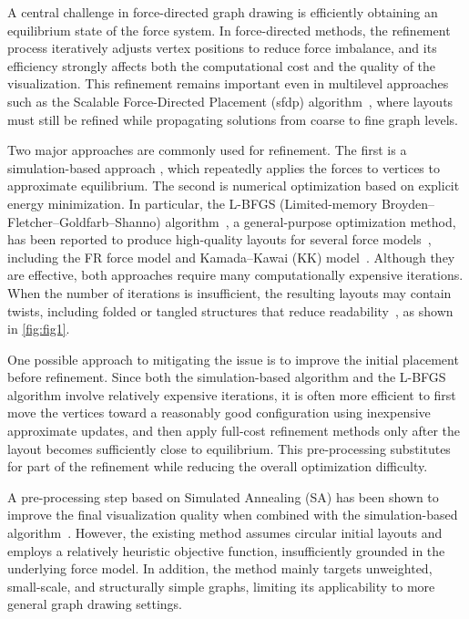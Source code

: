 \documentclass{jgaa-art}
\begin{document}
A central challenge in force-directed graph drawing is efficiently obtaining an equilibrium state of the force system.
In force-directed methods, the refinement process iteratively adjusts vertex positions to reduce force imbalance, and its efficiency strongly affects both the computational cost and the quality of the visualization.
This refinement remains important even in multilevel approaches such as the Scalable Force-Directed Placement (\textsf{sfdp}) algorithm~\citep{Hu2006EfficientHF,ellsonGraphvizOpenSource2002}, where layouts must still be refined while propagating solutions from coarse to fine graph levels.

Two major approaches are commonly used for refinement.
The first is a simulation-based approach \citep{fruchtermanGraphDrawingForcedirected1991}, which repeatedly applies the forces to vertices to approximate equilibrium.
The second is numerical optimization based on explicit energy minimization.
In particular, the L-BFGS (Limited-memory Broyden--Fletcher--Goldfarb--Shanno) algorithm~\citep{liuLimitedMemoryBFGS1989a}, a general-purpose optimization method, has been reported to produce high-quality layouts for several force models~\citep{6183577}, including the FR force model and Kamada--Kawai (KK) model~\citep{kamadaAlgorithmDrawingGeneral1989}.
Although they are effective, both approaches require many computationally expensive iterations.
When the number of iterations is insufficient, the resulting layouts may contain twists, including folded or tangled structures that reduce readability~\cite{veldhuizenDynamicMultilevelGraph2007,cheongSnapshotVisualizationComplex2018}, as shown in \cref{fig:fig1}.

One possible approach to mitigating the issue is to improve the initial placement before refinement.
Since both the simulation-based algorithm and the L-BFGS algorithm involve relatively expensive iterations, it is often more efficient to first move the vertices toward a reasonably good configuration using inexpensive approximate updates, and then apply full-cost refinement methods only after the layout becomes sufficiently close to equilibrium.
This pre-processing substitutes for part of the refinement while reducing the overall optimization difficulty.

A pre-processing step based on Simulated Annealing (SA) has been shown to improve the final visualization quality when combined with the simulation-based algorithm~\cite{ghassemitoosiSimulatedAnnealingPreProcessing2016}.
However, the existing method assumes circular initial layouts and employs a relatively heuristic objective function, insufficiently grounded in the underlying force model.
In addition, the method mainly targets unweighted, small-scale, and structurally simple graphs, limiting its applicability to more general graph drawing settings.
\end{document}
